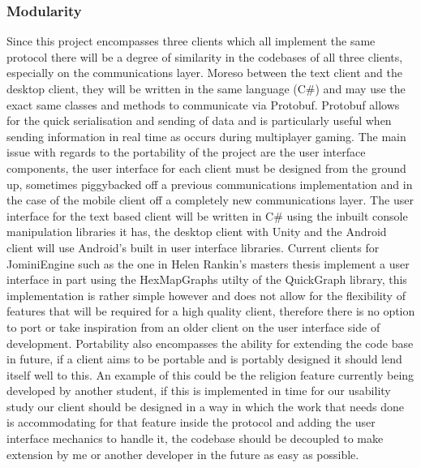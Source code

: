 \documentclass{article}
\begin{document}
    \subsubsection{Modularity}
    Since this project encompasses three clients which all implement the same protocol there will be a degree of similarity in the codebases of all three clients, especially on the communications layer. Moreso between the text client and the desktop client, they will be written in the same language (C\#) and may use the exact same classes and methods to communicate via Protobuf\cite{Protobuf}. Protobuf allows for the quick serialisation and sending of data and is particularly useful when sending information in real time as occurs during multiplayer gaming. The main issue with regards to the portability of the project are the user interface components, the user interface for each client must be designed from the ground up, sometimes piggybacked off a previous communications implementation and in the case of the mobile client off a completely new communications layer. The user interface for the text based client will be written in C\# using the inbuilt console manipulation libraries it has\cite{ConsoleClass}, the desktop client with Unity\cite{Unity3D} and the Android client will use Android's built in user interface libraries\cite{AndroidUI}. Current clients for JominiEngine such as the one in Helen Rankin's masters thesis\cite{helenrankin} implement a user interface in part using the HexMapGraphs utilty of the QuickGraph library\cite{QuickGraph}, this implementation is rather simple however and does not allow for the flexibility of features that will be required for a high quality client, therefore there is no option to port or take inspiration from an older client on the user interface side of development. Portability also encompasses the ability for extending the code base in future, if a client aims to be portable and is portably designed it should lend itself well to this. An example of this could be the religion feature currently being developed by another student, if this is implemented in time for our usability study our client should be designed in a way in which the work that needs done is accommodating for that feature inside the protocol and adding the user interface mechanics to handle it, the codebase should be decoupled to make extension by me or another developer in the future as easy as possible. 
\end{document}
